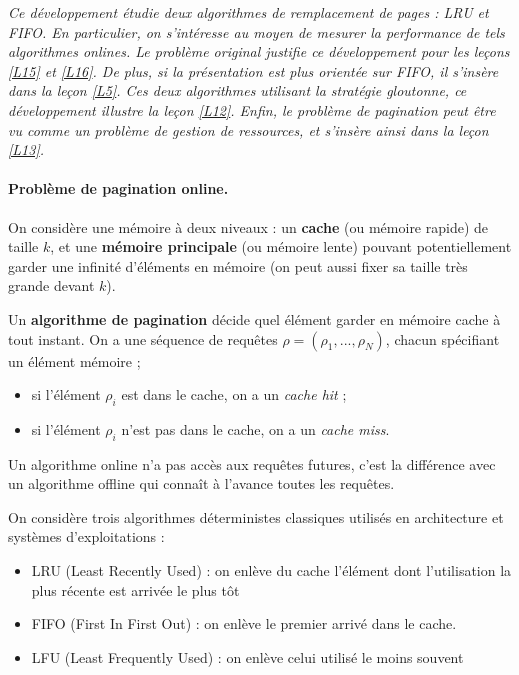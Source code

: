 
\textit{
Ce développement étudie deux algorithmes de remplacement de pages : LRU et FIFO. En particulier, on s'intéresse au moyen de mesurer la performance de tels algorithmes onlines. Le problème original justifie ce développement pour les leçons \ref{L15} et \ref{L16}. De plus, si la présentation est plus orientée sur FIFO, il s'insère dans la leçon \ref{L5}. Ces deux algorithmes utilisant la stratégie gloutonne, ce développement illustre la leçon \ref{L12}. Enfin, le problème de pagination peut être vu comme un problème de gestion de ressources, et s'insère ainsi dans la leçon \ref{L13}.
}

\paragraph{Problème de pagination online.} On considère une mémoire à deux niveaux : un \textbf{cache} (ou mémoire rapide) de taille $k$, et une \textbf{mémoire principale} (ou mémoire lente) pouvant potentiellement garder une infinité d'éléments en mémoire (on peut aussi fixer sa taille très grande devant $k$).\newline

Un \textbf{algorithme de pagination} décide quel élément garder en mémoire cache à tout instant. On a une séquence de requêtes $\rho = (\rho_1,...,\rho_N)$, chacun spécifiant un élément mémoire ;
\begin{itemize}
\item si l'élément $\rho_i$ est dans le cache, on a un \textit{cache hit} ;
\item si l'élément $\rho_i$ n'est pas dans le cache, on a un \textit{cache miss}.
\end{itemize}

\begin{center}
\end{center}

\begin{rem}
Un algorithme online n'a pas accès aux requêtes futures, c'est la différence avec un algorithme offline qui connaît à l'avance toutes les requêtes.
\end{rem}

On considère trois algorithmes déterministes classiques utilisés en architecture et systèmes d'exploitations :
\begin{itemize}
\item LRU (Least Recently Used) : on enlève du cache l'élément dont l'utilisation la plus récente est arrivée le plus tôt
\item FIFO (First In First Out) : on enlève le premier arrivé dans le cache.
\item LFU (Least Frequently Used) : on enlève celui utilisé le moins souvent
\end{itemize}

